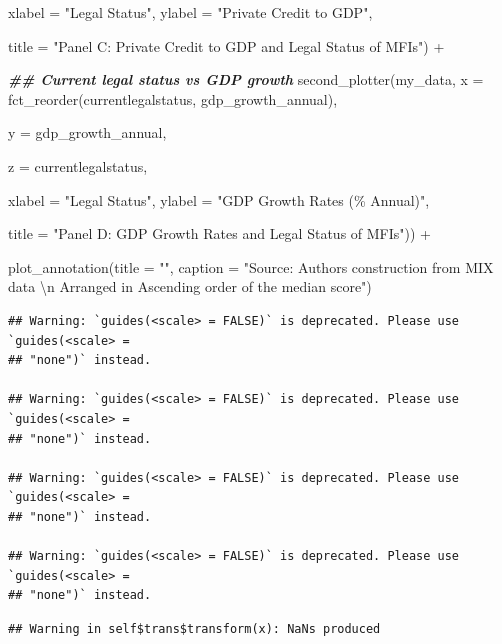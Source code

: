 \documentclass[a4paper,nobind]{templates/ociamthesis}
\newenvironment{Shaded}{\begin{snugshade}}{\end{snugshade}}
\newcommand{\AttributeTok}[1]{\textcolor[rgb]{0.77,0.63,0.00}{#1}}
\newcommand{\DocumentationTok}[1]{\textcolor[rgb]{0.56,0.35,0.01}{\textbf{\textit{#1}}}}
\newcommand{\FunctionTok}[1]{\textcolor[rgb]{0.00,0.00,0.00}{#1}}
\newcommand{\NormalTok}[1]{#1}
\newcommand{\SpecialCharTok}[1]{\textcolor[rgb]{0.00,0.00,0.00}{#1}}
\newcommand{\StringTok}[1]{\textcolor[rgb]{0.31,0.60,0.02}{#1}}
\renewenvironment{Shaded}
{
  \vspace{10pt}%
  \begin{snugshade}%
}{%
  \end{snugshade}%
  \vspace{8pt}%
}
\begin{document}
\begin{landscape}
\begin{Shaded}
\begin{Highlighting}[]
               \AttributeTok{xlabel =} \StringTok{"Legal Status"}\NormalTok{, }\AttributeTok{ylabel =} \StringTok{"Private Credit to GDP"}\NormalTok{, }
               
               \AttributeTok{title =} \StringTok{"Panel C: Private Credit to GDP and Legal Status of MFIs"}\NormalTok{) }\SpecialCharTok{+}


\DocumentationTok{\#\# Current legal status vs GDP growth }
\FunctionTok{second\_plotter}\NormalTok{(my\_data, }\AttributeTok{x =} \FunctionTok{fct\_reorder}\NormalTok{(currentlegalstatus, gdp\_growth\_annual), }
               
               \AttributeTok{y =}\NormalTok{ gdp\_growth\_annual, }
               
               \AttributeTok{z =}\NormalTok{ currentlegalstatus, }
               
               \AttributeTok{xlabel =} \StringTok{"Legal Status"}\NormalTok{, }\AttributeTok{ylabel =} \StringTok{"GDP Growth Rates (\% Annual)"}\NormalTok{, }
               
               \AttributeTok{title =} \StringTok{"Panel D: GDP Growth Rates and Legal Status of MFIs"}\NormalTok{)) }\SpecialCharTok{+}


\FunctionTok{plot\_annotation}\NormalTok{(}\AttributeTok{title =} \StringTok{""}\NormalTok{, }\AttributeTok{caption =} \StringTok{"Source: Authors\textquotesingle{} construction from MIX data }\SpecialCharTok{\textbackslash{}n}
\StringTok{                Arranged in Ascending order of the median score"}\NormalTok{)}
\end{Highlighting}
\end{Shaded}

\begin{verbatim}
## Warning: `guides(<scale> = FALSE)` is deprecated. Please use `guides(<scale> =
## "none")` instead.

## Warning: `guides(<scale> = FALSE)` is deprecated. Please use `guides(<scale> =
## "none")` instead.

## Warning: `guides(<scale> = FALSE)` is deprecated. Please use `guides(<scale> =
## "none")` instead.

## Warning: `guides(<scale> = FALSE)` is deprecated. Please use `guides(<scale> =
## "none")` instead.
\end{verbatim}

\begin{verbatim}
## Warning in self$trans$transform(x): NaNs produced
\end{verbatim}


\end{landscape}
\end{document}
